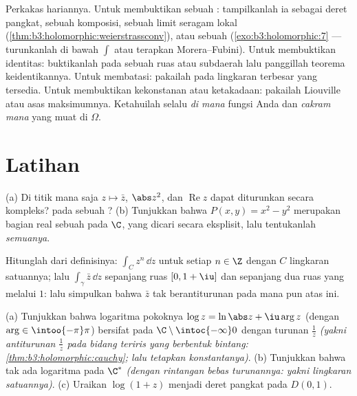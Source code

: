 \begin{method}\label{met:b3:holomorphic:toolkit}
Perkakas hariannya. Untuk membuktikan sebuah : tampilkanlah ia
sebagai deret pangkat, sebuah komposisi, sebuah limit seragam lokal
(\cref{thm:b3:holomorphic:weierstrassconv}), atau sebuah   (\cref{exo:b3:holomorphic:7} ---
turunkanlah di bawah $\int$ atau terapkan Morera--Fubini). Untuk membuktikan
identitas: buktikanlah pada sebuah ruas atau subdaerah lalu panggillah
teorema keidentikannya. Untuk membatasi: pakailah  pada
lingkaran terbesar yang tersedia. Untuk membuktikan kekonstanan atau ketakadaan:
pakailah Liouville atau asas maksimumnya. Ketahuilah selalu \emph{di mana}
fungsi Anda  dan \emph{cakram mana} yang muat di
$\Omega$.
\end{method}

\section{Latihan}

\begin{exercise}[$\star$]\label{exo:b3:holomorphic:1}
(a) Di titik mana saja $z \mapsto \bar z$, $\abs z^2$, dan
$\operatorname{Re}z$ dapat diturunkan secara kompleks?  pada sebuah
?
(b) Tunjukkan bahwa $P(x, y) = x^2 - y^2$ merupakan bagian real sebuah
 pada $\C$, yang dicari secara eksplisit, lalu tentukanlah
\emph{semuanya}.
\end{exercise}

\begin{exercise}[$\star$]\label{exo:b3:holomorphic:2}
Hitunglah dari definisinya: $\int_{C}z^n\,\dd z$ untuk setiap $n
\in \Z$ dengan $C$ lingkaran satuannya; lalu $\int_\gamma\bar z\,\dd z$ sepanjang
ruas $[0, 1+\iu]$ dan sepanjang  dua ruas
yang melalui $1$: lalu simpulkan bahwa $\bar z$ tak berantiturunan pada
 mana pun atas  ini.
\end{exercise}

\begin{exercise}[$\star\star$]\label{exo:b3:holomorphic:3}
(a) Tunjukkan bahwa logaritma pokoknya $\log z = \ln\abs z +
\iu\arg z$ (dengan $\arg \in \intoo{-\pi}\pi$) bersifat  pada
$\C\setminus\intoc{-\infty}0$ dengan turunan $\frac1z$
\emph{(yakni antiturunan $\frac1z$ pada bidang teriris yang berbentuk bintang:
\cref{thm:b3:holomorphic:cauchy}; lalu tetapkan konstantanya)}.
(b) Tunjukkan bahwa tak ada logaritma  pada
$\C^*$ \emph{(dengan rintangan bebas turunannya: yakni 
lingkaran satuannya)}.
(c) Uraikan $\log(1 + z)$ menjadi deret pangkat pada $D(0,1)$.
\end{exercise}

